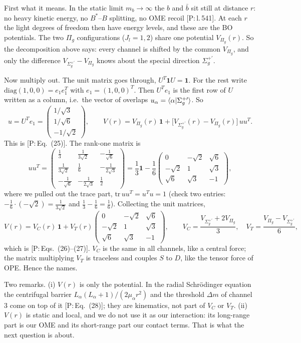 \documentclass[11pt,a4paper]{article}
\newcommand{\tagP}[1]{\textcolor{blue!65!black}{\textsf{\small[P:\,#1]}}}
\newenvironment{aiadd}{\par}{\par}
\begin{document}
\begin{aiadd}
	First what it means. In the static limit $m_b\to\infty$ the $b$ and $\bar b$ sit still at distance $r$: no heavy kinetic energy, no $B^*$--$B$ splitting, no OME recoil \tagP{l.\,541}. At each $r$ the light degrees of freedom then have energy levels, and these are the BO potentials. The two $\Pi_g$ configurations ($J_l=1,2$) share one potential $V_{\Pi_g}(r)$. So the decomposition above says: every channel is shifted by the common $V_{\Pi_g}$, and only the difference $V_{\Sigma_g^{+\prime}}-V_{\Pi_g}$ knows about the special direction $\Sigma_g^{+\prime}$.

	Now multiply out. The unit matrix goes through, $U^T\bm 1U=\bm 1$. For the rest write $\text{diag}(1,0,0)=e_1e_1^T$ with $e_1=(1,0,0)^T$. Then $U^Te_1$ is the first row of $U$ written as a column, i.e.\ the vector of overlaps $u_\alpha=\braket{\alpha|\Sigma_g^{+\prime}}$. So
	\[
		u=U^Te_1=\begin{pmatrix}1/\sqrt3\\ 1/\sqrt6\\ -1/\sqrt2\end{pmatrix},\qquad
		V(r)=V_{\Pi_g}(r)\,\bm 1+\big[V_{\Sigma_g^{+\prime}}(r)-V_{\Pi_g}(r)\big]\,uu^T .
	\]
	This is \tagP{Eq.~(25)}. The rank-one matrix is
	\[
		uu^T=\begin{pmatrix}
			\frac13           & \frac{1}{3\sqrt2}  & -\frac{1}{\sqrt6}  \\[1mm]
			\frac{1}{3\sqrt2} & \frac16            & -\frac{1}{2\sqrt3} \\[1mm]
			-\frac{1}{\sqrt6} & -\frac{1}{2\sqrt3} & \frac12
		\end{pmatrix}
		=\frac13\bm 1-\frac16\begin{pmatrix}0&-\sqrt2&\sqrt6\\ -\sqrt2&1&\sqrt3\\ \sqrt6&\sqrt3&-1\end{pmatrix},
	\]
	where we pulled out the trace part, $\text{tr}\,uu^T=u^Tu=1$ (check two entries: $-\frac16\cdot(-\sqrt2)=\frac{1}{3\sqrt2}$ and $\frac13-\frac16=\frac16$). Collecting the unit matrices,
	\[
		V(r)=V_C(r)\,\bm 1+V_T(r)\begin{pmatrix}0&-\sqrt2&\sqrt6\\ -\sqrt2&1&\sqrt3\\ \sqrt6&\sqrt3&-1\end{pmatrix},\qquad
		V_C=\frac{V_{\Sigma_g^{+\prime}}+2V_{\Pi_g}}{3},\quad V_T=\frac{V_{\Pi_g}-V_{\Sigma_g^{+\prime}}}{6},
	\]
	which is \tagP{Eqs.~(26)--(27)}. $V_C$ is the same in all channels, like a central force; the matrix multiplying $V_T$ is traceless and couples $S$ to $D$, like the tensor force of OPE. Hence the names.

	Two remarks. (i) $V(r)$ is only the potential. In the radial Schr\"odinger equation the centrifugal barrier $L_\alpha(L_\alpha+1)/(2\mu_\alpha r^2)$ and the threshold $\Delta m$ of channel 3 come on top of it \tagP{Eq.~(28)}; they are kinematics, not part of $V_C$ or $V_T$. (ii) $V(r)$ is static and local, and we do not use it as our interaction: its long-range part is our OME and its short-range part our contact terms. That is what the next question is about.
\end{aiadd}
\end{document}
